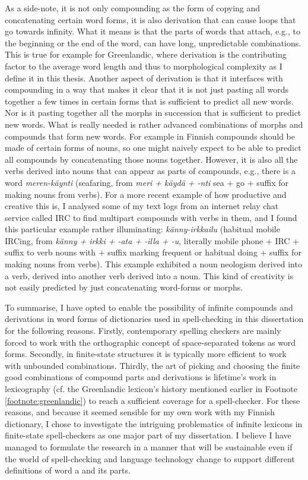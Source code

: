\documentclass[officiallayout,final]{unihelcompling}
\begin{document}
As a side-note, it is not only compounding as the form of copying and
concatenating certain word forms, it is also derivation that can cause loops
that go towards infinity. What it means is that the parts of words that attach,
e.g., to the beginning or the end of the word, can have long, unpredictable
combinations. This is true for example for Greenlandic, where derivation is the
contributing factor to the average word length and thus to \gls{morphological
complexity} as I define it in this thesis.  Another aspect of derivation is
that it interfaces with compounding in a way that makes it clear that it is not
just pasting all words together a few times in certain forms that is sufficient
to predict all new words. Nor is it pasting together all the morphs in
succession that is sufficient to predict new words. What is really needed is
rather advanced combinations of morphs and compounds that form new words. For
example in Finnish compounds should be made of certain forms of nouns, so one
might naively expect to be able to predict all compounds by concatenating those
nouns together. However, it is also all the verbs derived into nouns that can
appear as parts of compounds, e.g., there is a word \emph{meren-käynti}
(seafaring, from \emph{meri + käydä + -nti} sea + go + suffix for making nouns
from verbs).  For a more recent example of how productive and creative this is,
I analysed some of my text logs from an internet relay chat service called IRC
to find multipart compounds with verbs in them, and I found this particular
example rather illuminating: \emph{känny-irkkailu} (habitual mobile IRCing,
from \emph{känny + irkki + -ata + -illa + -u}, literally mobile phone + IRC +
suffix to verb nouns with + suffix marking frequent or habitual doing + suffix
for making nouns from verbs). This example exhibited a noun neologism derived
into a verb, derived into another verb derived into a noun.  This kind of
creativity is not easily predicted by just concatenating word-forms or morphs.

To summarise, I have opted to enable the possibility of infinite compounds and
derivations in word forms of dictionaries used in spell-checking in this
dissertation for the following reasons. Firstly, contemporary spelling checkers
are mainly forced to work with the orthographic concept of space-separated
tokens as word forms. Secondly, in finite-state structures it is typically more
efficient to work with unbounded combinations.  Thirdly, the art of picking and
choosing the finite good combinations of compound parts and derivations is
lifetime's work in lexicography (cf. the Greenlandic lexicon's history
mentioned earlier in Footnote \ref{footnote:greenlandic}) to reach a sufficient
coverage for a spell-checker.  For these reasons, and because it seemed
sensible for my own work with my Finnish dictionary, I chose to investigate the
intriguing problematics of infinite lexicons in finite-state spell-checkers as
one major part of my dissertation. I believe I have managed to formulate the
research in a manner that will be sustainable even if the world of
spell-checking and language technology change to support different definitions
of word a and its parts.
\end{document}
